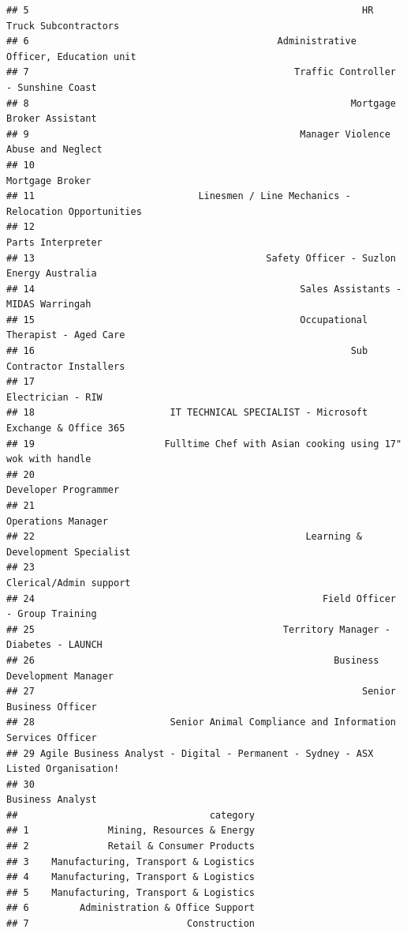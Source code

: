 \documentclass[11pt,a4paper,]{article}
\begin{document}
\begin{verbatim}
## 5                                                           HR Truck Subcontractors
## 6                                            Administrative Officer, Education unit
## 7                                               Traffic Controller - Sunshine Coast
## 8                                                         Mortgage Broker Assistant
## 9                                                Manager Violence Abuse and Neglect
## 10                                                                  Mortgage Broker
## 11                             Linesmen / Line Mechanics - Relocation Opportunities
## 12                                                                Parts Interpreter
## 13                                         Safety Officer - Suzlon Energy Australia
## 14                                               Sales Assistants - MIDAS Warringah
## 15                                               Occupational Therapist - Aged Care
## 16                                                        Sub Contractor Installers
## 17                                                                Electrician - RIW
## 18                        IT TECHNICAL SPECIALIST - Microsoft Exchange & Office 365
## 19                       Fulltime Chef with Asian cooking using 17" wok with handle
## 20                                                             Developer Programmer
## 21                                                               Operations Manager
## 22                                                Learning & Development Specialist
## 23                                                           Clerical/Admin support
## 24                                                   Field Officer - Group Training
## 25                                            Territory Manager - Diabetes - LAUNCH
## 26                                                     Business Development Manager
## 27                                                          Senior Business Officer
## 28                        Senior Animal Compliance and Information Services Officer
## 29 Agile Business Analyst - Digital - Permanent - Sydney - ASX Listed Organisation!
## 30                                                                 Business Analyst
##                                  category
## 1              Mining, Resources & Energy
## 2              Retail & Consumer Products
## 3    Manufacturing, Transport & Logistics
## 4    Manufacturing, Transport & Logistics
## 5    Manufacturing, Transport & Logistics
## 6         Administration & Office Support
## 7                            Construction

\end{verbatim}
\end{document}
